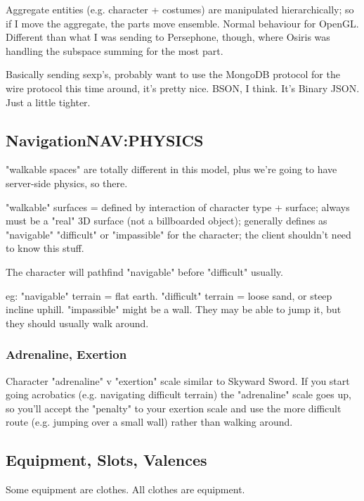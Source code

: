 \documentclass[11pt]{article}
\begin{document}
Aggregate  entities  (e.g.   character  +  costumes)  are  manipulated
hierarchically; so if  I move the aggregate, the  parts move ensemble.
Normal  behaviour for  OpenGL. Different  than what  I was  sending to
Persephone, though, where Osiris was handling the subspace summing for
the most part.

Basically sending  sexp's, probably want  to use the  MongoDB protocol
for the  wire protocol  this time  around, it's  pretty nice.  BSON, I
think. It's Binary JSON. Just a little tighter.
\subsection{Navigation\hfill{}\textsc{NAV:PHYSICS}}
\label{sec-1-6}

"walkable  spaces" are  totally different  in this  model, plus  we're
going to have server-side physics, so there.


"walkable"  surfaces =  defined  by interaction  of  character type  +
surface;  always  must be  a  "real"  3D  surface (not  a  billboarded
object); generally defines as  "navigable" "difficult" or "impassible"
for the character; the client shouldn't need to know this stuff.

The character will pathfind "navigable" before "difficult" usually.

eg:  "navigable" terrain  = flat  earth. "difficult"  terrain =  loose
sand, or steep incline uphill. "impassible"  might be a wall. They may
be able to jump it, but they should usually walk around.


\subsubsection{Adrenaline, Exertion}
\label{sec-1-6-1}


Character "adrenaline" v "exertion" scale similar to Skyward Sword. If
you  start going  acrobatics (e.g.  navigating difficult  terrain) the
"adrenaline" scale  goes up,  so you'll accept  the "penalty"  to your
exertion scale and  use the more difficult route (e.g.  jumping over a
small wall) rather than walking around.

\subsection{Equipment, Slots, Valences}
\label{sec-1-7}


Some equipment are clothes. All clothes are equipment.
\end{document}
